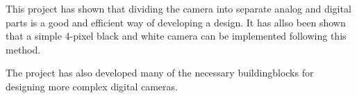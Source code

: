 This project has shown that dividing the camera into separate analog and digital parts is a good and efficient way of developing a design.
It has allso been shown that a simple 4-pixel black and white camera can be implemented following this method.

The project has also developed many of the necessary buildingblocks for designing more complex
digital cameras.